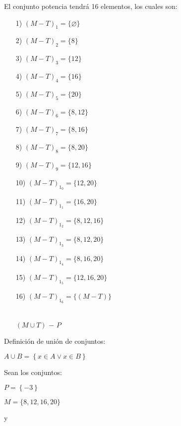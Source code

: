 \documentclass[12pt]{article}
\begin{document}
El conjunto potencia tendrá 16 elementos, los cuales son:

\begin{enumerate}
    \item [1)] $(M-T)_1 = \{\varnothing\} $  
    \item [2)] $(M-T)_2 = \{8\} $
    \item [3)] $(M-T)_3 = \{12\} $
    \item [4)] $(M-T)_4 = \{16\} $
    \item [5)] $(M-T)_5 = \{20\} $
    \item [6)] $(M-T)_6 = \{8, 12\} $
    \item [7)] $(M-T)_7 = \{8, 16\} $
    \item [8)] $(M-T)_8 = \{8, 20\} $
    \item [9)] $(M-T)_9 = \{12,16\} $
    \item [10)] $(M-T)_1_0 = \{12, 20\} $
    \item [11)] $(M-T)_1_1 = \{16, 20\} $
    \item [12)] $(M-T)_1_2 = \{8, 12, 16\} $
    \item [13)] $(M-T)_1_3 = \{8, 12,20\} $
    \item [14)] $(M-T)_1_4 = \{8, 16, 20\} $
    \item [15)] $(M-T)_1_5 = \{12, 16, 20\} $
    \item [16)] $(M-T)_1_6 = \{(M-T)\}$\\ \\
\end{enumerate}

\begin{enumerate}
        \item [\blue{c)}]$(M \cup T)$ $-$ $P$
\end{enumerate}

Definición de unión de conjuntos: 
\begin{center}
    $A \cup B = \left\{x \in A \vee x \in B\right\}$
\end{center}

Sean los conjuntos:

\begin{center}
    $P= \left\{-3\right\}$
\end{center}

\begin{center}
   $M=\{8, 12, 16, 20\}$
\end{center}

\begin{center}
    y
\end{center}
\end{document}
